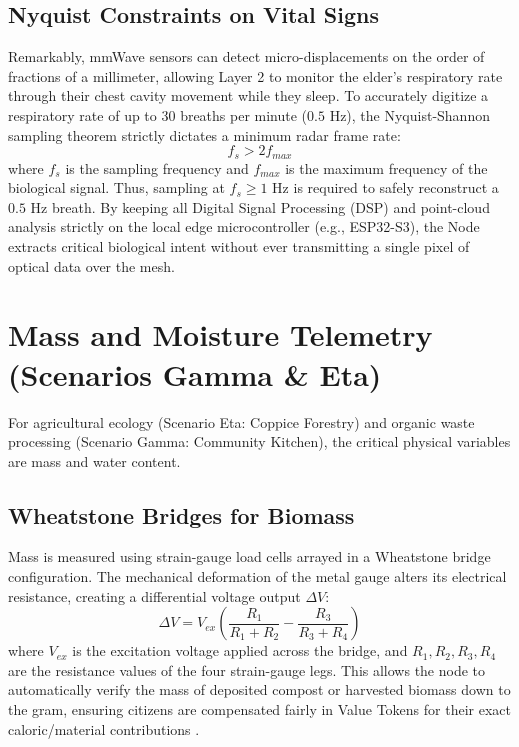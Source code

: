 \subsection{Nyquist Constraints on Vital Signs}
Remarkably, mmWave sensors can detect micro-displacements on the order of fractions of a millimeter, allowing Layer 2 to monitor the elder's respiratory rate through their chest cavity movement while they sleep. To accurately digitize a respiratory rate of up to 30 breaths per minute ($0.5$ Hz), the Nyquist-Shannon sampling theorem strictly dictates a minimum radar frame rate:
\begin{equation}
f_s > 2 f_{max}
\end{equation}
where $f_s$ is the sampling frequency and $f_{max}$ is the maximum frequency of the biological signal. Thus, sampling at $f_s \ge 1$ Hz is required to safely reconstruct a $0.5$ Hz breath. By keeping all Digital Signal Processing (DSP) and point-cloud analysis strictly on the local edge microcontroller (e.g., ESP32-S3), the Node extracts critical biological intent without ever transmitting a single pixel of optical data over the mesh.

\section{Mass and Moisture Telemetry (Scenarios Gamma \& Eta)}
For agricultural ecology (Scenario Eta: Coppice Forestry) and organic waste processing (Scenario Gamma: Community Kitchen), the critical physical variables are mass and water content. 

\subsection{Wheatstone Bridges for Biomass}
Mass is measured using strain-gauge load cells arrayed in a Wheatstone bridge configuration. The mechanical deformation of the metal gauge alters its electrical resistance, creating a differential voltage output $\Delta V$:
\begin{equation}
\Delta V = V_{ex} \left( \frac{R_1}{R_1+R_2} - \frac{R_3}{R_3+R_4} \right)
\end{equation}
where $V_{ex}$ is the excitation voltage applied across the bridge, and $R_1, R_2, R_3, R_4$ are the resistance values of the four strain-gauge legs. This allows the node to automatically verify the mass of deposited compost or harvested biomass down to the gram, ensuring citizens are compensated fairly in Value Tokens for their exact caloric/material contributions \cite{fraden2010handbook}.

